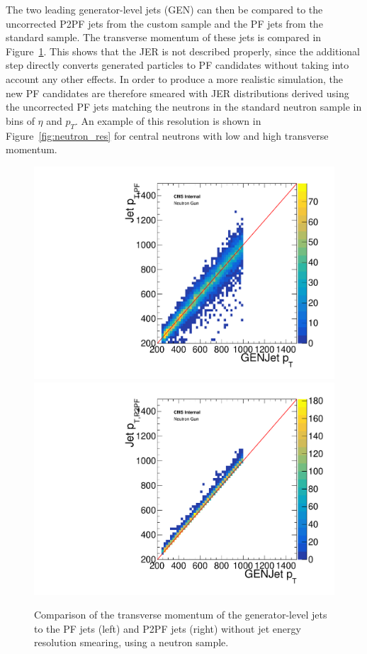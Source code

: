 The two leading generator-level jets (GEN) can then be compared to the uncorrected P2PF jets from the custom sample and the \ac{PF} jets from the standard sample. The transverse momentum of these jets is compared in Figure~\ref{fig:neutron}. This shows that the \ac{JER} is not described properly, since the additional step directly converts generated particles to \ac{PF} candidates without taking into account any other effects. In order to produce a more realistic simulation, the new \ac{PF} candidates are therefore smeared with \ac{JER} distributions derived using the uncorrected \ac{PF} jets matching the neutrons in the standard neutron sample in bins of $\eta$ and $p_T$. An example of this resolution is shown in Figure~\ref{fig:neutron_res} for central neutrons with low and high transverse momentum.

\begin{figure}[ht]
  \centering
 \includegraphics[width=.48\textwidth]{pt_neutron_gun_th2f_JECs_GetRandom2.pdf} \hfill
\includegraphics[width=.48\textwidth]{pt_neutron_gun_p2pf_th2f_NoSmearing.pdf}
 \caption{Comparison of the transverse momentum of the generator-level jets to the \ac{PF} jets (left) and P2PF jets (right) without jet energy resolution smearing, using a neutron sample.}
 \label{fig:neutron}
\end{figure}

